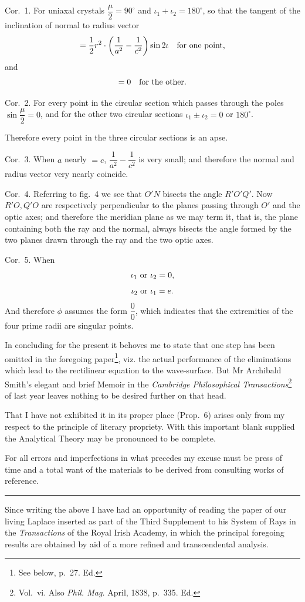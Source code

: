 \documentclass[11pt]{article}
\newcommand{\sourcepage}[1]{\marginpar{\scriptsize p.~#1}}
\begin{document}
Cor.~1. For uniaxal crystals $\dfrac{\mu}{2}=90^\circ$ and $\iota_1+\iota_2=180^\circ$, so that the tangent of the inclination of normal to radius vector
\[
 ={1\over2}r^2\cdot\left({1\over a^2}-{1\over c^2}\right)\sin 2\iota
 \quad\hbox{for one point,}
\]
and
\[
 =0\quad\hbox{for the other.}
\]

Cor.~2. For every point in the circular section which passes through the poles $\sin\dfrac{\mu}{2}=0$, and for the other two circular sections $\iota_1\pm\iota_2=0$ or $180^\circ$.

Therefore every point in the three circular sections is an apse.

Cor.~3. When $a$ nearly $=c$, $\dfrac1{a^2}-\dfrac1{c^2}$ is very small; and therefore the normal and radius vector very nearly coincide.

Cor.~4. Referring to fig.~4 we see that $O'N$ bisects the angle $R'O'Q'$. Now $R'O,Q'O$ are respectively perpendicular to the planes passing through $O'$ and the optic axes; and therefore the meridian plane as we may term it, that is, the plane containing both the ray and the normal, always bisects the angle formed by the two planes drawn through the ray and the two optic axes.

Cor.~5. When
\[
 \iota_1\hbox{ or }\iota_2=0,
\]
\[
 \iota_2\hbox{ or }\iota_1=e.
\]
And therefore $\phi$ assumes the form $\dfrac00$, which indicates that the extremities of the four prime radii are singular points.

In concluding for the present it behoves me to state that one step has been omitted in the foregoing paper\footnote{See below, p.~27. Ed.}, viz. the actual performance of the eliminations which lead to the rectilinear equation to the wave-surface. But Mr Archibald Smith's elegant and brief Memoir in the \emph{Cambridge Philosophical Transactions}\footnote{Vol.~vi. Also \emph{Phil. Mag.} April, 1838, p.~335. Ed.} of last year leaves nothing to be desired further on that head.

\sourcepage{19}
That I have not exhibited it in its proper place (Prop.~6) arises only from my respect to the principle of literary propriety. With this important blank supplied the Analytical Theory may be pronounced to be complete.

For all errors and imperfections in what precedes my excuse must be press of time and a total want of the materials to be derived from consulting works of reference.

\bigskip\hrule\bigskip

Since writing the above I have had an opportunity of reading the paper of our living Laplace inserted as part of the Third Supplement to his System of Rays in the \emph{Transactions} of the Royal Irish Academy, in which the principal foregoing results are obtained by aid of a more refined and transcendental analysis.
\end{document}
